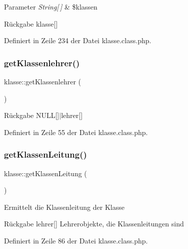 \begin{DoxyParams}{Parameter}
{\em String\mbox{[}$\,$\mbox{]}} & \$klassen \\
\hline
\end{DoxyParams}
\begin{DoxyReturn}{Rückgabe}
klasse\mbox{[}\mbox{]} 
\end{DoxyReturn}


Definiert in Zeile 234 der Datei klasse.\+class.\+php.

\mbox{\label{classklasse_abc6acd9f1e5d5635b504547f0da348b5}} 
\subsubsection{\texorpdfstring{get\+Klassenlehrer()}{getKlassenlehrer()}}
{\footnotesize\ttfamily klasse\+::get\+Klassenlehrer (\begin{DoxyParamCaption}{ }\end{DoxyParamCaption})}

\begin{DoxyReturn}{Rückgabe}
N\+U\+LL\mbox{[}\mbox{]}$\vert$lehrer\mbox{[}\mbox{]} 
\end{DoxyReturn}


Definiert in Zeile 55 der Datei klasse.\+class.\+php.

\mbox{\label{classklasse_ad250f20dadf7ea4c9c53d51574e30727}} 
\subsubsection{\texorpdfstring{get\+Klassen\+Leitung()}{getKlassenLeitung()}}
{\footnotesize\ttfamily klasse\+::get\+Klassen\+Leitung (\begin{DoxyParamCaption}{ }\end{DoxyParamCaption})}

Ermittelt die Klassenleitung der Klasse \begin{DoxyReturn}{Rückgabe}
lehrer\mbox{[}\mbox{]} Lehrerobjekte, die Klassenleitungen sind 
\end{DoxyReturn}


Definiert in Zeile 86 der Datei klasse.\+class.\+php.

